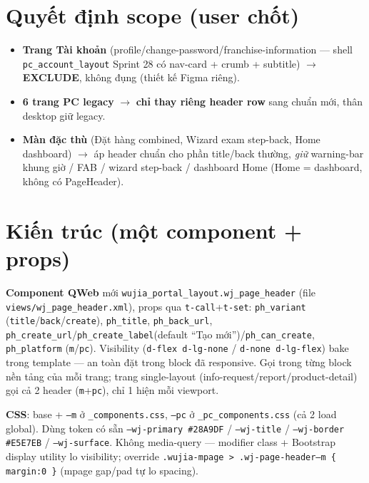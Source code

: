 \section{Quyết định scope (user chốt)}

\begin{itemize}
\item \textbf{Trang Tài khoản} (profile/change-password/franchise-information --- shell
      \texttt{pc\_account\_layout} Sprint 28 có nav-card + crumb + subtitle) $\rightarrow$ \textbf{EXCLUDE},
      không đụng (thiết kế Figma riêng).
\item \textbf{6 trang PC legacy} $\rightarrow$ \textbf{chỉ thay riêng header row} sang chuẩn mới, thân
      desktop giữ legacy.
\item \textbf{Màn đặc thù} (Đặt hàng combined, Wizard exam step-back, Home dashboard) $\rightarrow$ áp
      header chuẩn cho phần title/back thường, \emph{giữ} warning-bar khung giờ / FAB / wizard step-back /
      dashboard Home (Home = dashboard, không có PageHeader).
\end{itemize}

\section{Kiến trúc (một component + props)}

\textbf{Component QWeb} mới \texttt{wujia\_portal\_layout.wj\_page\_header} (file
\texttt{views/wj\_page\_header.xml}), props qua \texttt{t-call}+\texttt{t-set}: \texttt{ph\_variant}
(\texttt{title}/\texttt{back}/\texttt{create}), \texttt{ph\_title}, \texttt{ph\_back\_url},
\texttt{ph\_create\_url}/\texttt{ph\_create\_label}(default ``Tạo mới'')/\texttt{ph\_can\_create},
\texttt{ph\_platform} (\texttt{m}/\texttt{pc}). Visibility (\texttt{d-flex d-lg-none} /
\texttt{d-none d-lg-flex}) bake trong template --- an toàn đặt trong block đã responsive. Gọi trong
từng block nền tảng của mỗi trang; trang single-layout (info-request/report/product-detail) gọi cả 2
header (\texttt{m}+\texttt{pc}), chỉ 1 hiện mỗi viewport.

\textbf{CSS}: base + \texttt{--m} ở \texttt{\_components.css}, \texttt{--pc} ở
\texttt{\_pc\_components.css} (cả 2 load global). Dùng token có sẵn \texttt{--wj-primary \#28A9DF} /
\texttt{--wj-title} / \texttt{--wj-border \#E5E7EB} / \texttt{--wj-surface}. Không media-query --- modifier
class + Bootstrap display utility lo visibility; override \texttt{.wujia-mpage > .wj-page-header--m
\{ margin:0 \}} (mpage gap/pad tự lo spacing).

